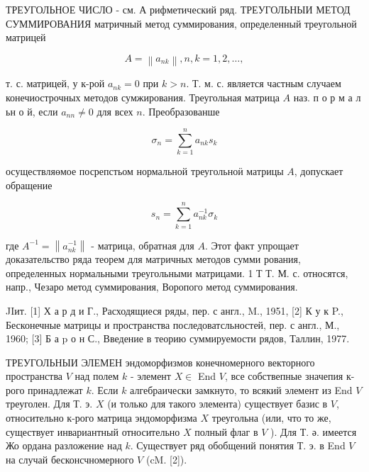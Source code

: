 \documentclass[10pt]{article}
\begin{document}
ТРЕУГОЛЬНОЕ ЧИСЛО - см. А рифметический ряд. ТРЕУГОЛЬНЫИ МЕТОД СУММИРОВАНИЯ матричный метод суммирования, определенный треугольной матрицей



\[

A=\left\|a_{n k}\right\|, n, k=1,2, \ldots,

\]



т. с. матрицей, у к-рой $a_{n k}=0$ при $k>n$. Т. м. с. является частным случаем конечиострочных методов сумжирования. Треугольная матрица $A$ наз. п о р м а л ьн о й, если $a_{n n} \neq 0$ для всех $n$. Преобразованше



\[

\sigma_{n}=\sum_{k=1}^{n} a_{n k} s_{k}

\]



осуществляөмое посрепстьом нормальной треугольноӥ матрицы $A$, допускает обращение



\[

s_{n}=\sum_{k=1}^{n} a_{n k}^{-1} \sigma_{k}

\]



где $A^{-1}=\left\|a_{n k}^{-1}\right\|$ - матрица, обратная для $A$. Этот факт упрощает доказательство ряда теорем для матричных методов сумми рования, определенных нормальными треугольными матрицами. 1 Т Т. М. с. относятся, напр., Чезаро метод суммирования, Воропого метод суммирования.



JIит. [1] Х а р д и Г., Расходящиеся ряды, пер. с англ., M., 1951, [2] К у к P., Бесконечные матрицы и пространства последоватсльностей, пер. с англ., М., 1960; [3] Б а p о н С., Введение в теорию суммируемости рядов, Таллин, 1977.



ТРЕУГОЛЬНЫИ ЭЛЕМЕН эндоморфизмов конечномерного векторного пространства $V$ над полем $k$ - элемент $X \in$ End $V$, все собствепные значепия к-рого принадлежат $k$. Если $k$ алгебраически замкнуто, то всякий элемент из End $V$ треуголен. Для Т. э. $X$ (и только для такого элемента) существует базис в $V$, относительно к-рого матрица эндоморфизма $X$ треугольна (или, что то же, существует инвариантный относительно $X$ полный флаг в $V$ ). Для Т. ә. имеется Жо ордана разложение над $k$. Существует ряд обобщений понятия Т. э. в End $V$ на случай бесконсчномерного $V$ (cM. [2]).
\end{document}
